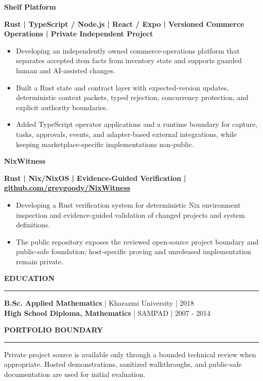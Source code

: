 \documentclass[10pt,a4paper]{article}
\newcommand{\cvsection}[1]{%
  \Needspace{4\baselineskip}%
  \vspace{0.42em}%
  {\fontsize{10.2}{11.9}\selectfont\bfseries\color{navy}\MakeUppercase{#1}}\par
  \vspace{0.16em}\color{rule}\hrule\color{text}\vspace{0.30em}%
}
\newcommand{\project}[2]{%
  \Needspace{6\baselineskip}%
  {\fontsize{10.35}{12.1}\selectfont\bfseries\color{navy}#1}\par
  {\fontsize{9.05}{10.6}\selectfont\color{muted}\bfseries #2}\par
}
\begin{document}
\vspace{0.22em}
\project{Shelf Platform}{Rust | TypeScript / Node.js | React / Expo | Versioned Commerce Operations | Private Independent Project}
\begin{itemize}
  \item Developing an independently owned commerce-operations platform that separates accepted item facts from inventory state and supports guarded human and AI-assisted changes.
  \item Built a Rust state and contract layer with expected-version updates, deterministic context packets, typed rejection, concurrency protection, and explicit authority boundaries.
  \item Added TypeScript operator applications and a runtime boundary for capture, tasks, approvals, events, and adapter-based external integrations, while keeping marketplace-specific implementations non-public.
\end{itemize}

\vspace{0.22em}
\project{NixWitness}{Rust | Nix/NixOS | Evidence-Guided Verification | \href{https://github.com/greygoody/NixWitness}{github.com/greygoody/NixWitness}}
\begin{itemize}
  \item Developing a Rust verification system for deterministic Nix environment inspection and evidence-guided validation of changed projects and system definitions.
  \item The public repository exposes the reviewed open-source project boundary and public-safe foundation; host-specific proving and unreleased implementation remain private.
\end{itemize}

\cvsection{Education}

\textbf{B.Sc. Applied Mathematics} | Kharazmi University | 2018\\
\textbf{High School Diploma, Mathematics} | SAMPAD | 2007 - 2014

\cvsection{Portfolio Boundary}

Private project source is available only through a bounded technical review when appropriate. Hosted demonstrations, sanitized walkthroughs, and public-safe documentation are used for initial evaluation.
\end{document}
